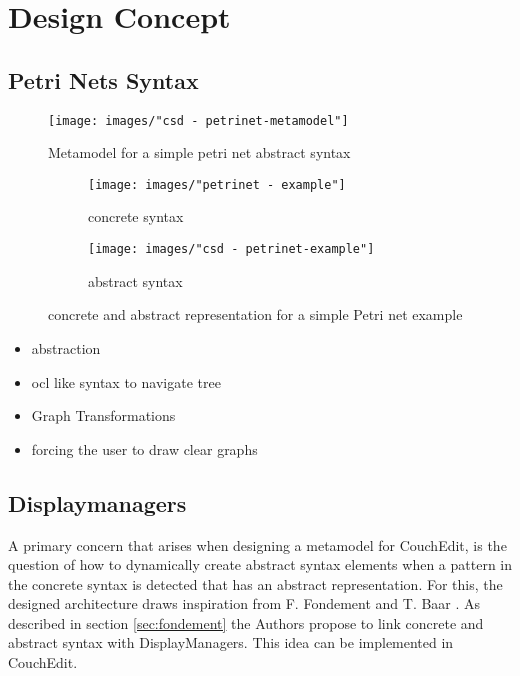 \chapter{Design Concept}



\section{Petri Nets Syntax}


\begin{figure}
  \centering
  \texttt{[image: images/"csd - petrinet-metamodel"]}
  \caption{Metamodel for a simple petri net abstract syntax}
  \label{fig:petrinets_metamodel}
\end{figure}

\begin{figure}[h!]
  \centering
  \begin{subfigure}[t]{.4\textwidth}
    \centering
    \texttt{[image: images/"petrinet - example"]}
    \caption{concrete syntax}
    \label{subfig:petriconcrete}    
  \end{subfigure}
  \begin{subfigure}[t]{.45\textwidth}
    \centering
    \texttt{[image: images/"csd - petrinet-example"]}
    \caption{abstract syntax}
    \label{subfig:petriabstract}    
  \end{subfigure}
  \caption{concrete and abstract representation for a simple Petri net example}
  \label{fig:petrinets_metamodel}
\end{figure}

   


\begin{itemize}
  \item abstraction
  \item ocl like syntax to navigate tree
  \item Graph Transformations 
  \item forcing the user to draw clear graphs
\end{itemize}


\section{Displaymanagers}
A primary concern that arises when designing a metamodel for CouchEdit, is the question of how to dynamically create abstract syntax elements when a pattern in the concrete syntax is detected that has an abstract representation. For this, the designed architecture draws inspiration from F. Fondement and T. Baar \cite{fondement_making_2005}. As described in section \ref{sec:fondement} the Authors propose to link concrete and abstract syntax with DisplayManagers. This idea can be implemented in CouchEdit.


